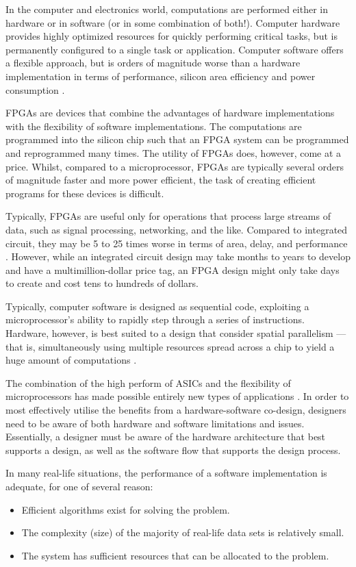 In the computer and electronics world, computations are performed either in
hardware or in software (or in some combination of both!). Computer hardware
provides highly optimized resources for quickly performing critical tasks, but
is permanently configured to a single task or application. Computer software
offers a flexible approach, but is orders of magnitude worse than a hardware
implementation in terms of performance, silicon area efficiency and power
consumption \cite{Hauck:2007}.

\glspl{FPGA} are devices that combine the advantages of hardware implementations
with the flexibility of software implementations. The computations are
programmed into the silicon chip such that an FPGA system can be programmed and
reprogrammed many times. The utility of FPGAs does, however, come at a price.
Whilst, compared to a microprocessor, FPGAs are typically several orders of
magnitude faster and more power efficient, the task of creating efficient
programs for these devices is difficult.

Typically, \glspl{FPGA} are useful only for operations that process large
streams of data, such as signal processing, networking, and the like. Compared
to integrated circuit, they may be 5 to 25 times worse in terms of area, delay,
and performance \cite{Hauck:2007}. However, while an integrated circuit design
may take months to years to develop and have a multimillion-dollar price tag, an
\gls{FPGA} design might only take days to create and cost tens to hundreds of
dollars.

Typically, computer software is designed as sequential code, exploiting a
microprocessor's ability to rapidly step through a series of instructions.
Hardware, however, is best suited to a design that consider spatial parallelism
--- that is, simultaneously using multiple resources spread across a chip to
yield a huge amount of computations \cite{Hauck:2007}.

The combination of the high perform of \glspl{ASIC} and the flexibility of
microprocessors has made possible entirely new types of applications
\cite{Hauck:2007}. In order to most effectively utilise the benefits from a
hardware-software co-design, designers need to be aware of both hardware and
software limitations and issues. Essentially, a designer must be aware of the
hardware architecture that best supports a design, as well as the software flow
that supports the design process.

In many real-life situations, the performance of a software implementation is
adequate, for one of several reason:
\begin{itemize}
    \item Efficient algorithms exist for solving the problem.
    \item The complexity (size) of the majority of real-life data sets is
        relatively small.
    \item The system has sufficient resources that can be allocated to the
        problem.
\end{itemize}

